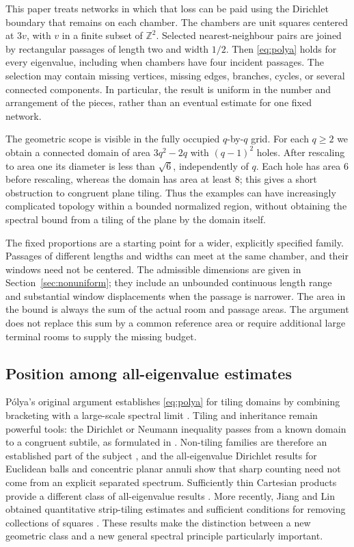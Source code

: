 \documentclass[11pt,reqno]{amsart}
\numberwithin{equation}{section}
\newcommand{\Z}{\mathbb Z}
\begin{document}
This paper treats networks in which that loss can be paid using the
Dirichlet boundary that remains on each chamber. The chambers are unit
squares centered at $3v$, with $v$ in a finite subset of $\Z^2$.
Selected nearest-neighbour pairs are joined by rectangular passages of
length two and width $1/2$. Then \eqref{eq:polya} holds for every eigenvalue,
including when chambers have four incident passages. The
selection may contain missing vertices, missing edges, branches,
cycles, or several connected components. In particular, the result
is uniform in the number and arrangement of the pieces, rather than
an eventual estimate for one fixed network.

The geometric scope is visible in the fully occupied $q$-by-$q$
grid. For each $q\ge2$ we obtain a connected domain of area $3q^2-2q$
with $(q-1)^2$ holes. After rescaling to area one its diameter is less than
$\sqrt6$, independently of $q$. Each hole has area $6$ before
rescaling, whereas the domain has area at least $8$; this gives a
short obstruction to congruent plane tiling. Thus the examples can
have increasingly complicated topology within a bounded normalized
region, without obtaining the spectral bound from a tiling of the
plane by the domain itself.

The fixed proportions are a starting point for a wider, explicitly
specified family. Passages of different lengths and widths can meet
at the same chamber, and their windows need not be centered. The
admissible dimensions are given in Section~\ref{sec:nonuniform}; they
include an unbounded continuous length range and substantial window
displacements when the passage is narrower. The area in the bound is
always the sum of the actual room and passage areas. The argument does
not replace this sum by a common reference area or require additional
large terminal rooms to supply the missing budget.

\subsection*{Position among all-eigenvalue estimates}

P\'olya's original argument establishes \eqref{eq:polya} for tiling
domains by combining bracketing with a large-scale spectral limit
\cite{Polya}. Tiling and inheritance remain powerful tools: the
Dirichlet or Neumann inequality passes from a known domain to a
congruent subtile, as formulated in \cite{FLPS}. Non-tiling families
are therefore an established part of the subject
\cite{FreitasSalavessa}, and the all-eigenvalue Dirichlet results for Euclidean
balls \cite{FLPS} and concentric planar annuli \cite{Annuli}
show that sharp counting need not come from an explicit separated
spectrum. Sufficiently thin Cartesian products provide a different
class of all-eigenvalue results \cite{HeWang}. More recently, Jiang and Lin obtained
quantitative strip-tiling estimates and sufficient conditions for
removing collections of squares \cite{JiangLin}. These results
make the distinction between a new geometric class and a new general
spectral principle particularly important.
\end{document}
